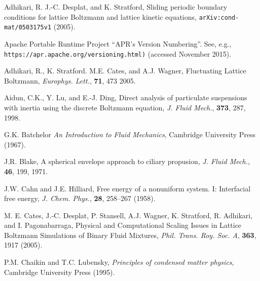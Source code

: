 %
%
%
%
%
%

\vfill
\pagebreak



\begin{thebibliography}{99}


Adhikari, R. J.-C. Desplat, and K. Stratford,
Sliding periodic boundary conditions for lattice Boltzmann and lattice
kinetic equations,
\texttt{arXiv:cond-mat/0503175v1} (2005).

Apache Portable Runtime Project ``APR's Version Numbering''.
See, e.g., \texttt{https://apr.apache.org/versioning.html)}
(accessed November 2015).

Adhikari, R., K. Stratford. M.E. Cates, and A.J. Wagner,
Fluctuating Lattice Boltzmann,
\textit{Europhys. Lett.}, \textbf{71}, 473 2005.

Aidun, C.K., Y. Lu, and E.-J. Ding,
Direct analysis of particulate suspensions with inertia using the
discrete Boltzmann equation,
\textit{J. Fluid Mech.}, \textbf{373}, 287, 1998.

G.K. Batchelor
\textit{An Introduction to Fluid Mechanics},
Cambridge University Press (1967).

J.R. Blake, A spherical envelope approach to ciliary propusion,
\textit{J. Fluid Mech.}, \textbf{46}, 199, 1971.

J.W. Cahn and J.E. Hilliard,
Free energy of a nonuniform system. I: Interfacial free energy,
\textit{J. Chem. Phys.}, \textbf{28}, 258--267 (1958).

M. E. Cates, J.-C. Desplat, P. Stansell, A.J. Wagner, K. Stratford,
R. Adhikari, and I. Pagonabarraga,
Physical and Computational Scaling Issues in Lattice Boltzmann
Simulations of Binary Fluid Mixtures,
\textit{Phil. Trans. Roy. Soc. A}, \textbf{363}, 1917 (2005). 

P.M. Chaikin and T.C. Lubensky,
\textit{Principles of condensed matter physics},
Cambridge University Press (1995).


\end{thebibliography}
